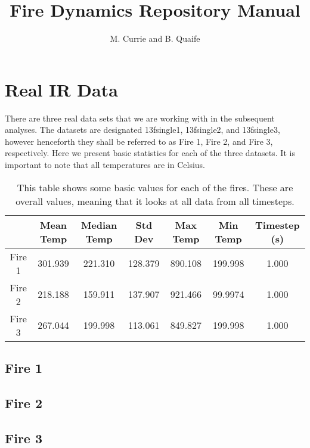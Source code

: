 \documentclass{article}
\begin{document}
\title{Fire Dynamics Repository Manual}
\author{M. Currie and B. Quaife}
\maketitle



\section{Real IR Data}
There are three real data sets that we are working with in the subsequent analyses. The datasets are designated 13fsingle1, 13fsingle2, and 13fsingle3, however henceforth they shall be referred to as Fire 1, Fire 2, and Fire 3, respectively. Here we present basic statistics for each of the three datasets. It is important to note that all temperatures are in Celsius.

\begin{table}
\centering
\begin{tabular}{|c|c|c|c|c|c|c|}
\hline
 & Mean Temp & Median Temp & Std Dev & Max Temp & Min Temp & Timestep (s) \\
\hline
Fire 1 & 301.939 & 221.310 & 128.379 & 890.108 & 199.998 & 1.000 \\
\hline
Fire 2 & 218.188 & 159.911 & 137.907 & 921.466 & 99.9974 & 1.000 \\
\hline
Fire 3 & 267.044 & 199.998 & 113.061 & 849.827 & 199.998 & 1.000 \\
\hline
\end{tabular}
\caption{This table shows some basic values for each of the fires. These are overall values, meaning that it looks at all data from all timesteps.}
\end{table}

\subsection{Fire 1}

\subsection{Fire 2}

\subsection{Fire 3}
\end{document}
